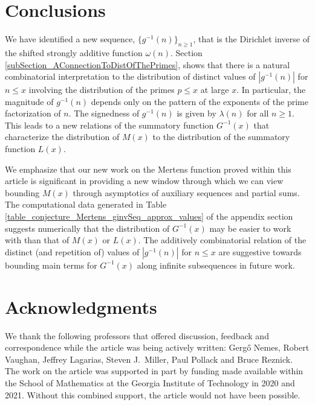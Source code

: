 \documentclass[11pt,reqno,a4letter]{article}
\numberwithin{figure}{section}
\numberwithin{table}{section}
\theoremstyle{plain}
\numberwithin{theorem}{section}
\theoremstyle{definition}
\begin{document}
\section{Conclusions}

We have identified a new sequence, 
$\{g^{-1}(n)\}_{n \geq 1}$, that is the Dirichlet inverse of the 
shifted strongly additive function $\omega(n)$. 
Section \ref{subSection_AConnectionToDistOfThePrimes}, 
shows that there is a natural combinatorial interpretation to the 
distribution of distinct values 
of $|g^{-1}(n)|$ for $n \leq x$ involving the distribution of the 
primes $p \leq x$ at large $x$. 
In particular, the magnitude of $g^{-1}(n)$ depends only on the pattern of 
the exponents of the prime factorization of $n$. 
The signedness of $g^{-1}(n)$ is given by $\lambda(n)$ for all $n \geq 1$. 
This leads to a new relations of the 
summatory function $G^{-1}(x)$ that characterize the distribution of $M(x)$ 
to the distribution of the summatory function $L(x)$. 

We emphasize that our new work on the Mertens function proved within this article 
is significant in providing a new window through which we can view bounding $M(x)$ 
through asymptotics of auxiliary sequences and partial sums. 
The computational data generated in 
Table \ref{table_conjecture_Mertens_ginvSeq_approx_values} of the appendix section 
suggests numerically that the distribution of $G^{-1}(x)$ may be easier to work with 
than that of $M(x)$ or $L(x)$. 
The additively combinatorial 
relation of the distinct (and repetition of) values of $|g^{-1}(n)|$ 
for $n \leq x$ are suggestive towards bounding main terms for $G^{-1}(x)$ along 
infinite subsequences in future work. 

\section*{Acknowledgments}

We thank the following professors that offered 
discussion, feedback and correspondence while the article was being actively written: 
Gerg\H{o} Nemes, Robert Vaughan, Jeffrey Lagarias, Steven J.~Miller, 
Paul Pollack and Bruce Reznick. 
The work on the article was supported in part by 
funding made available within the School of Mathematics at the 
Georgia Institute of Technology in 2020 and 2021. 
Without this combined support, the article would not have been possible.

\renewcommand{\refname}{References} 

\end{document}
